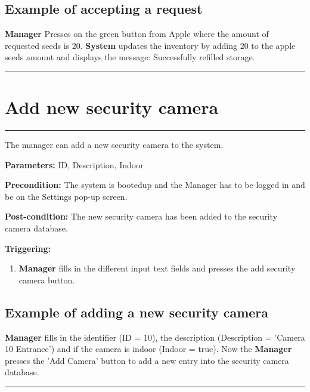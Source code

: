 \subsection{Example of accepting a request}
\textbf{Manager} Presses on the green button from Apple where the amount of
requested seeds is 20. \textbf{System} updates the inventory by adding 20 to the
apple seeds amount and displays the message: Successfully refilled storage.
\hfill
\vspace{0.5cm}
\hrule





\section{Add new security camera}
\hrule
\hfill
\vspace{0.5cm}
\label{operation:Add new security camera}

The manager can add a new security camera to the system.

\begin{description}

\item \textbf{Parameters:} ID, Description, Indoor
\item \textbf{Precondition:} The system is bootedup and the Manager has to be
logged in and be on the Settings pop-up screen.
\item \textbf{Post-condition:} The new security camera has been added to the security camera database.
\item \textbf{Triggering:}
\begin{enumerate}

\item \textbf{Manager} fills in the different input text fields and presses
the add security camera button.

\end{enumerate}
\end{description}

\subsection{Example of adding a new security camera}
\textbf{Manager} fills in the identifier (ID = 10), the description (Description = 'Camera 10 Entrance') and if the camera is indoor (Indoor = true). 
Now the \textbf{Manager} presses the 'Add Camera' button to add a new entry into the security camera database.
\hfill
\vspace{0.5cm}
\hrule



